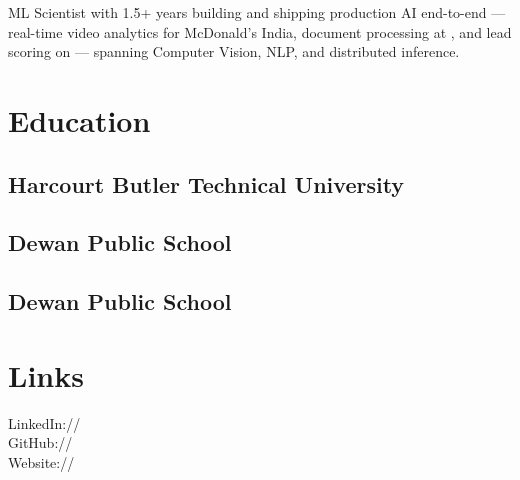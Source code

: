 \documentclass[]{deedy-resume-openfont}
\begin{document}
\lastupdated


ML Scientist with 1.5+ years building and shipping production AI end-to-end --- real-time video analytics for McDonald's India, document processing at , and lead scoring on  --- spanning Computer Vision, NLP, and distributed inference.
\sectionsep


\vspace{-8pt}
\begin{minipage}[t]{0.33\textwidth}

\section{Education}

\subsection{Harcourt Butler Technical University}
\sectionsep

\subsection{Dewan Public School}
\sectionsep

\subsection{Dewan Public School}
\sectionsep

\section{Links}
LinkedIn:// \href{https://linkedin.com/in/paritkansal}{} \\
GitHub:// \href{https://github.com/ParitKansal}{} \\
Website:// \href{https://paritkansal.in}{}
\sectionsep


\end{minipage}
\end{document}
